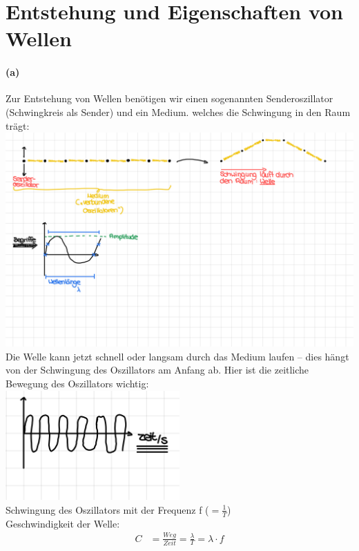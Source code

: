 \documentclass[12pt,a4paper]{report}
\begin{document}
	\setcounter{section}{11}
	\section{Entstehung und Eigenschaften von Wellen}
	\paragraph{(a)} Zur Entstehung von Wellen benötigen wir einen sogenannten Senderoszillator (\dq Schwingkreis als Sender\dq) und ein Medium. welches die Schwingung in den Raum trägt:\\[0.5cm]
	\includegraphics[width=\textwidth]{JPEG-Bild-43F1-AA6D-6C-0.JPEG}
	\\
	Die Welle kann jetzt schnell oder langsam durch das Medium laufen -- dies hängt von der Schwingung des Oszillators am Anfang ab.
	Hier ist die zeitliche Bewegung des Oszillators wichtig:
	\\[0.5cm]
	\includegraphics[width=0.5\textwidth]{JPEG-Bild-40BC-BB87-5A-0.JPEG}
	\\
	Schwingung des Oszillators mit der Frequenz f ($= \frac{1}{T}$) \\
	Geschwindigkeit der Welle:
	\begin{align*}
		C &= \frac{Weg}{Zeit} = \frac{\lambda}{T} = \lambda \cdot f
	\end{align*}
	\newpage
\end{document}
